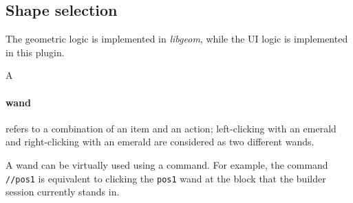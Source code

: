 \documentclass{article}
\begin{document}
		\subsection{Shape selection}
			The geometric logic is implemented in \textit{libgeom}, while the UI logic is implemented in this plugin.

			A \paragraph{wand} refers to a combination of an item and an action; left-clicking with an emerald and
			right-clicking with an emerald are considered as two different wands.

			A wand can be virtually used using a command. For example, the command \texttt{//pos1} is equivalent to clicking
			the \texttt{pos1} wand at the block that the builder session currently stands in.
\end{document}
